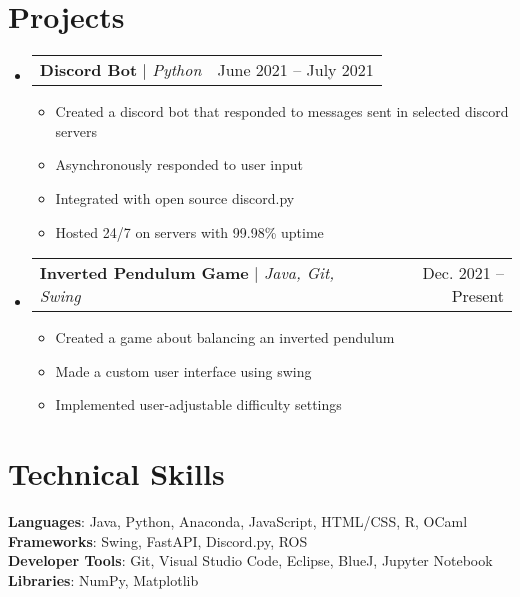 \documentclass[letterpaper,11pt]{article}
\makeatletter
\newcommand{\resumeItem}[1]{
  \item\small{
    {#1 \vspace{-2pt}}
  }
}
\newcommand{\resumeProjectHeading}[2]{
    \item
    \begin{tabular*}{0.97\textwidth}{l@{\extracolsep{\fill}}r}
      \small#1 & #2 \\
    \end{tabular*}\vspace{-7pt}
}
\newcommand{\resumeSubHeadingListStart}{\begin{itemize}[leftmargin=0.15in, label={}]}
\newcommand{\resumeSubHeadingListEnd}{\end{itemize}}
\newcommand{\resumeItemListStart}{\begin{itemize}}
\newcommand{\resumeItemListEnd}{\end{itemize}\vspace{-5pt}}
\makeatother
\begin{document}
\section{Projects}
    \resumeSubHeadingListStart
      \resumeProjectHeading
          {\textbf{Discord Bot} $|$ \emph{Python}}{June 2021 -- July 2021}
          \resumeItemListStart
            \resumeItem{Created a discord bot that responded to messages sent in selected discord servers}
            \resumeItem{Asynchronously responded to user input}
            \resumeItem{Integrated with open source discord.py}
            \resumeItem{Hosted 24/7 on servers with 99.98\% uptime}
          \resumeItemListEnd
      \resumeProjectHeading
          {\textbf{Inverted Pendulum Game} $|$ \emph{Java, Git, Swing}}{Dec. 2021 -- Present}
          \resumeItemListStart
            \resumeItem{Created a game about balancing an inverted pendulum}
            \resumeItem{Made a custom user interface using swing}
            \resumeItem{Implemented user-adjustable difficulty settings}
          \resumeItemListEnd
    \resumeSubHeadingListEnd



%
\section{Technical Skills}
 \begin{itemize}[leftmargin=0.15in, label={}]
    \small{\item{
     \textbf{Languages}{: Java, Python, Anaconda, JavaScript, HTML/CSS, R, OCaml} \\
     \textbf{Frameworks}{: Swing, FastAPI, Discord.py, ROS} \\
     \textbf{Developer Tools}{: Git, Visual Studio Code, Eclipse, BlueJ, Jupyter Notebook} \\
     \textbf{Libraries}{: NumPy, Matplotlib}
    }}
 \end{itemize}


\end{document}
